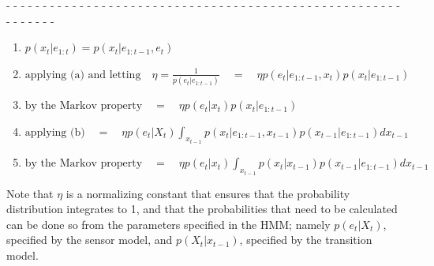 \begin{center}
- - - - - - - - - - - - - - - - - - - - - - - - - - - - - - - - - - - - - - - - - - - - - - - - - - - - - - - - - - - - - 
\end{center}

\begin{enumerate}
\item {\hfil $ p(x_t | e_{1:t}) = p(x_t | e_{1:t-1}, e_t) $ }

\item {\hfil $ \text{applying (a) and letting} \quad \eta = \frac{1}{p(e_t | e_{1:t-1})} \quad = \quad \eta p(e_t | e_{1:t-1}, x_t)p(x_t|e_{1:t-1}) $ }

\item {\hfil $ \text{by the Markov property} \quad = \quad \eta p(e_t | x_t)p(x_t|e_{1:t-1})$}

\item {\hfil $\text{applying (b)} \quad =  \quad \eta p(e_t | X_t)\int_{x_{t-1}}p(x_t|e_{1:t-1}, x_{t-1}) p(x_{t-1}|e_{1:t-1})dx_{t-1}$}

\item {\hfil  $ \text{by the Markov property} \quad = \quad \eta p(e_t | x_t)\int_{x_{t-1}}p(x_t|x_{t-1}) p(x_{t-1}|e_{1:t-1})dx_{t-1} $}

\end{enumerate}
Note that $\eta$ is a normalizing constant that ensures that the probability distribution integrates to 1, and that the probabilities that need to be calculated can be done so from the parameters specified in the HMM; namely $p(e_t | X_t)$, specified by the sensor model, and $p(X_t | x_{t-1})$, specified by the transition model.

